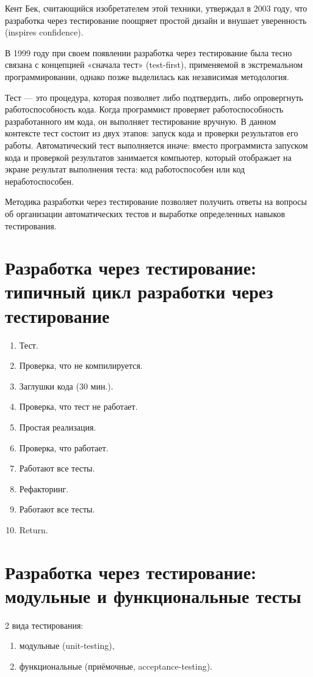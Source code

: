 \documentclass{article}
\let\stdsection\section
\renewcommand\section{\newpage\stdsection}
\begin{document}
    Кент Бек, считающийся изобретателем этой техники, утверждал в 2003 году, что разработка через тестирование поощряет простой дизайн и внушает уверенность (inspires confidence).

    В 1999 году при своем появлении разработка через тестирование была тесно связана с концепцией «сначала тест» (test-first), применяемой в экстремальном программировании, однако позже выделилась как независимая методология.

    Тест — это процедура, которая позволяет либо подтвердить, либо опровергнуть работоспособность кода. Когда программист проверяет работоспособность разработанного им кода, он выполняет тестирование вручную. В данном контексте тест состоит из двух этапов: запуск кода и проверки результатов его работы. Автоматический тест выполняется иначе: вместо программиста запуском кода и проверкой результатов занимается компьютер, который отображает на экране результат выполнения теста: код работоспособен или код неработоспособен.

    Методика разработки через тестирование позволяет получить ответы на вопросы об организации автоматических тестов и выработке определенных навыков тестирования.

\section{Разработка через тестирование: типичный цикл разработки через тестирование}
    \begin{enumerate}
        \item Тест.
        \item Проверка, что не компилируется.
        \item Заглушки кода (30 мин.).
        \item Проверка, что тест не работает.
        \item Простая реализация.
        \item Проверка, что работает.
        \item Работают все тесты.
        \item Рефакторинг.
        \item Работают все тесты.
        \item Return.
    \end{enumerate}

\section{Разработка через тестирование: модульные и функциональные тесты}
    2 вида тестирования:
    \begin{enumerate}
        \item модульные (unit-testing),
        \item функциональные (приёмочные, acceptance-testing).
    \end{enumerate}
\end{document}
